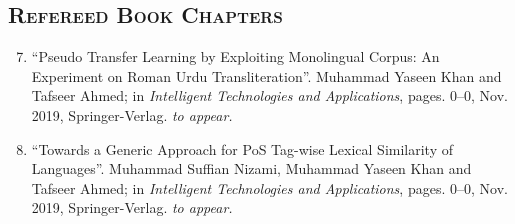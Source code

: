 \documentclass[a4paper, 10pt]{article}
\begin{document}
\subsection*{\normalfont\textsc{Refereed Book Chapters}}
\begin{enumerate}
\setcounter{enumi}{6}
\itemsep-4pt 
 \item ``Pseudo Transfer Learning by Exploiting Monolingual Corpus: An Experiment on Roman Urdu Transliteration''. Muhammad Yaseen Khan and Tafseer Ahmed; in \emph{Intelligent Technologies and Applications}, pages. 0--0, Nov. 2019, Springer-Verlag. \emph{\small to appear.}
  
   \item ``Towards a Generic Approach for PoS Tag-wise Lexical Similarity of Languages''. Muhammad Suffian Nizami, Muhammad Yaseen Khan and Tafseer Ahmed; in \emph{Intelligent Technologies and Applications}, pages. 0--0, Nov. 2019, Springer-Verlag. \emph{\small to appear.}
 \end{enumerate}
\end{document}
